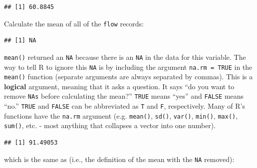 \documentclass[]{book}
\newenvironment{Shaded}{\begin{snugshade}}{\end{snugshade}}
\newcommand{\KeywordTok}[1]{\textcolor[rgb]{0.13,0.29,0.53}{\textbf{#1}}}
\newcommand{\DataTypeTok}[1]{\textcolor[rgb]{0.13,0.29,0.53}{#1}}
\newcommand{\OperatorTok}[1]{\textcolor[rgb]{0.81,0.36,0.00}{\textbf{#1}}}
\newcommand{\NormalTok}[1]{#1}
\theoremstyle{definition}
\theoremstyle{definition}
\theoremstyle{definition}
\theoremstyle{remark}
\begin{document}
\begin{Shaded}
\end{Shaded}

\begin{verbatim}
## [1] 60.8845
\end{verbatim}

Calculate the mean of all of the \texttt{flow} records:

\begin{Shaded}
\end{Shaded}

\begin{verbatim}
## [1] NA
\end{verbatim}

\texttt{mean()} returned an \texttt{NA} because there is an \texttt{NA}
in the data for this variable. The way to tell R to ignore this
\texttt{NA} is by including the argument \texttt{na.rm\ =\ TRUE} in the
\texttt{mean()} function (separate arguments are always separated by
commas). This is a \textbf{logical} argument, meaning that it asks a
question. It says ``do you want to remove \texttt{NAs} before
calculating the mean?'' \texttt{TRUE} means ``yes'' and \texttt{FALSE}
means ``no.'' \texttt{TRUE} and \texttt{FALSE} can be abbreviated as
\texttt{T} and \texttt{F}, respectively. Many of R's functions have the
\texttt{na.rm} argument (e.g. \texttt{mean()}, \texttt{sd()},
\texttt{var()}, \texttt{min()}, \texttt{max()}, \texttt{sum()}, etc. -
most anything that collapses a vector into one number).

\begin{Shaded}
\end{Shaded}

\begin{verbatim}
## [1] 91.49053
\end{verbatim}

which is the same as (i.e., the definition of the mean with the
\texttt{NA} removed):
\end{document}
